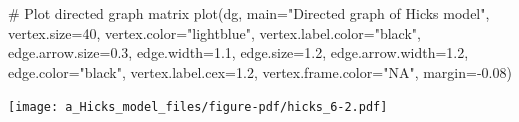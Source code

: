 \documentclass[
  letterpaper,
  DIV=11,
  numbers=noendperiod]{scrreprt}
\newenvironment{Shaded}{\begin{snugshade}}{\end{snugshade}}
\newcommand{\AttributeTok}[1]{\textcolor[rgb]{0.40,0.45,0.13}{#1}}
\newcommand{\CommentTok}[1]{\textcolor[rgb]{0.37,0.37,0.37}{#1}}
\newcommand{\DecValTok}[1]{\textcolor[rgb]{0.68,0.00,0.00}{#1}}
\newcommand{\FloatTok}[1]{\textcolor[rgb]{0.68,0.00,0.00}{#1}}
\newcommand{\FunctionTok}[1]{\textcolor[rgb]{0.28,0.35,0.67}{#1}}
\newcommand{\NormalTok}[1]{\textcolor[rgb]{0.00,0.23,0.31}{#1}}
\newcommand{\SpecialCharTok}[1]{\textcolor[rgb]{0.37,0.37,0.37}{#1}}
\newcommand{\StringTok}[1]{\textcolor[rgb]{0.13,0.47,0.30}{#1}}
\begin{document}
\begin{Shaded}
\begin{Highlighting}[]
\CommentTok{\# Plot directed graph matrix}
\FunctionTok{plot}\NormalTok{(dg, }\AttributeTok{main=}\StringTok{"Directed graph of Hicks model"}\NormalTok{, }\AttributeTok{vertex.size=}\DecValTok{40}\NormalTok{, }\AttributeTok{vertex.color=}\StringTok{"lightblue"}\NormalTok{, }
     \AttributeTok{vertex.label.color=}\StringTok{"black"}\NormalTok{, }\AttributeTok{edge.arrow.size=}\FloatTok{0.3}\NormalTok{, }\AttributeTok{edge.width=}\FloatTok{1.1}\NormalTok{, }\AttributeTok{edge.size=}\FloatTok{1.2}\NormalTok{,}
     \AttributeTok{edge.arrow.width=}\FloatTok{1.2}\NormalTok{, }\AttributeTok{edge.color=}\StringTok{"black"}\NormalTok{, }\AttributeTok{vertex.label.cex=}\FloatTok{1.2}\NormalTok{, }
     \AttributeTok{vertex.frame.color=}\StringTok{"NA"}\NormalTok{, }\AttributeTok{margin=}\SpecialCharTok{{-}}\FloatTok{0.08}\NormalTok{)}
\end{Highlighting}
\end{Shaded}

\texttt{[image: a\_Hicks\_model\_files/figure-pdf/hicks\_6-2.pdf]}
\end{document}
